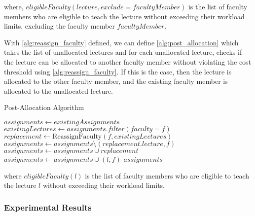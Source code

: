 where, $eligibleFaculty(lecture, exclude=facultyMember)$ is the list of faculty members who are eligible to teach the lecture without exceeding their workload limits, excluding the faculty member $facultyMember$.

With \autoref{alg:reassign_faculty} defined, we can define \autoref{alg:post_allocation} which takes the list of unallocated lectures and for each unallocated lecture, checks if the lecture can be allocated to another faculty member without violating the cost threshold using \autoref{alg:reassign_faculty}. If this is the case, then the lecture is allocated to the other faculty member, and the existing faculty member is allocated to the unallocated lecture.

\begin{algorithm}[H]
  \caption{Post-Allocation Algorithm}
  \begin{algorithmic}[1]
    \State $assignments \gets existingAssignments$
    \State $existingLectures \gets assignments.filter(faculty=f)$
    \State $replacement \gets \text{ReassignFaculty}(f, existingLectures)$
    \State $assignments \gets assignments \setminus (replacement.lecture, f)$
    \State $assignments \gets assignments \cup replacement$
    \State $assignments \gets assignments \cup (l, f)$
    \EndIf
    \EndFor
    \EndFor
    \State \Return $assignments$
    \EndProcedure
  \end{algorithmic}
  \label{alg:post_allocation}
\end{algorithm}

where $eligibleFaculty(l)$ is the list of faculty members who are eligible to teach the lecture $l$ without exceeding their workload limits.

\subsubsection{Experimental Results}

